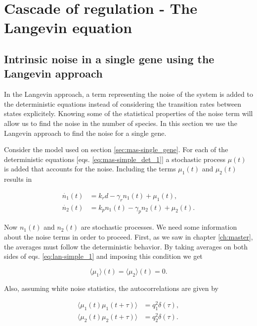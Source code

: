 \chapter{Cascade of regulation - The Langevin equation}
\label{ch:langevin}

\section{Intrinsic noise in a single gene using the Langevin approach}
\label{sec:lan-single}
In the Langevin approach, a term representing the noise of the system is added to the deterministic equations instead of considering the transition rates between states explicitely. Knowing some of the statistical properties of the noise term will allow us to find the noise in the number of species. In this section we use the Langevin approach to find the noise for a single gene.

Consider the model used on section \ref{sec:mas-single_gene}. For each of the deterministic equations [eqs. \eqref{eq:mas-simple_det_1}] a stochastic process $\mu(t)$ is added that accounts for the noise. Including the terms $\mu_1(t)$ and $\mu_2(t)$ results in

\begin{equation}
  \label{eq:lan-simple_1}
  \begin{split}
    \dot{n_1}(t) &= k_rd-\gamma_rn_1(t) + \mu_1(t),\\
    \dot{n_2}(t) &= k_pn_1(t)-\gamma_pn_2(t) + \mu_2(t).
  \end{split}
\end{equation}

Now $n_1(t)$ and $n_2(t)$ are stochastic processes. We need some information about the noise terms in order to proceed. First, as we saw in chapter \ref{ch:master}, the averages must follow the deterministic behavior. By taking averages on both sides of eqs. \eqref{eq:lan-simple_1} and imposing this condition we get

\begin{equation*}
  \langle\mu_1\rangle(t) = \langle\mu_2\rangle(t) = 0.
\end{equation*}

Also, assuming white noise statistics, the autocorrelations are given by

\begin{align}
  \langle\mu_1(t)\mu_1(t+\tau)\rangle &= q_1^2\delta(\tau),\label{eq:lan-simple_cor1} \\
  \langle\mu_2(t)\mu_2(t+\tau)\rangle &= q_2^2\delta(\tau). \label{eq:lan-simple_cor2}
\end{align}

